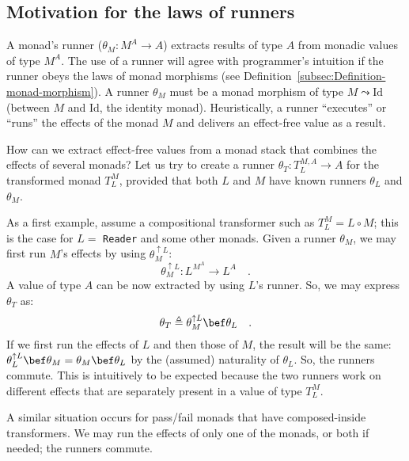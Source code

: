 \subsection{Motivation for the laws of runners}

A monad\textsf{'}s runner ($\theta_{M}:M^{A}\rightarrow A$)
extracts results of type $A$ from monadic values of type $M^{A}$.
The use of a runner will agree with programmer\textsf{'}s intuition if the
runner obeys the laws of monad morphisms (see Definition~\ref{subsec:Definition-monad-morphism}).
A runner $\theta_{M}$ must be a monad morphism of type $M\leadsto\text{Id}$
(between $M$ and $\text{Id}$, the identity monad). Heuristically,
a runner \textsf{``}executes\textsf{''} or \textsf{``}runs\textsf{''} the effects of the monad $M$
and delivers an effect-free value as a result.

How can we extract effect-free values from a monad stack that combines
the effects of several monads? Let us try to create a runner $\theta_{T}:T_{L}^{M,A}\rightarrow A$
for the transformed monad $T_{L}^{M}$, provided that both $L$ and
$M$ have known runners $\theta_{L}$ and $\theta_{M}$.

As a first example, assume a compositional transformer such as $T_{L}^{M}=L\circ M$;
this is the case for $L=$ \lstinline!Reader! and some other monads.
Given a runner $\theta_{M}$, we may first run $M$\textsf{'}s effects by using
$\theta_{M}^{\uparrow L}$:
\[
\theta_{M}^{\uparrow L}:L^{M^{A}}\rightarrow L^{A}\quad.
\]
A value of type $A$ can be now extracted by using $L$\textsf{'}s runner.
So, we may express $\theta_{T}$ as:
\[
\theta_{T}\triangleq\theta_{M}^{\uparrow L}\bef\theta_{L}\quad.
\]
If we first run the effects of $L$ and then those of $M$, the result
will be the same: $\theta_{L}^{\uparrow L}\bef\theta_{M}=\theta_{M}\bef\theta_{L}$
by the (assumed) naturality of $\theta_{L}$. So, the runners commute.
This is intuitively to be expected because the two runners work on
different effects that are separately present in a value of type $T_{L}^{M}$.

A similar situation occurs for pass/fail monads that have composed-inside
transformers. We may run the effects of only one of the monads, or
both if needed; the runners commute.


